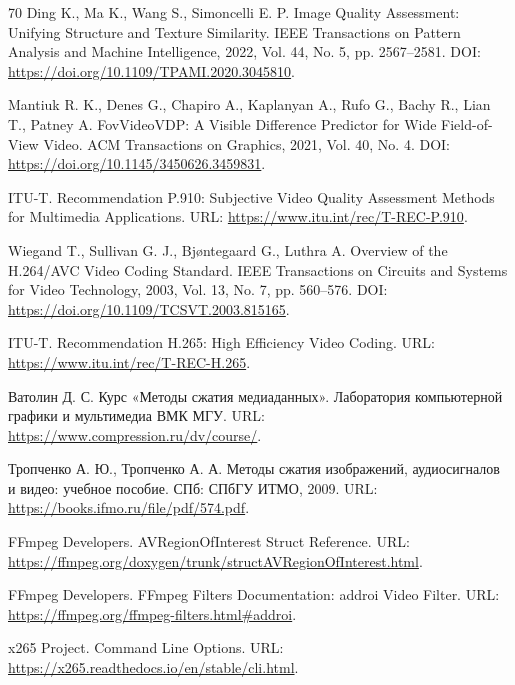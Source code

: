 \documentclass[12pt,a4paper,oneside,openany]{report}
\begin{document}
\begin{thebibliography}{70}
  Ding K., Ma K., Wang S., Simoncelli E. P. Image Quality Assessment: Unifying Structure and
  Texture Similarity. IEEE Transactions on Pattern Analysis and Machine Intelligence, 2022,
  Vol. 44, No. 5, pp. 2567--2581. DOI: \url{https://doi.org/10.1109/TPAMI.2020.3045810}.

  Mantiuk R. K., Denes G., Chapiro A., Kaplanyan A., Rufo G., Bachy R., Lian T., Patney A.
  FovVideoVDP: A Visible Difference Predictor for Wide Field-of-View Video. ACM Transactions on
  Graphics, 2021, Vol. 40, No. 4. DOI: \url{https://doi.org/10.1145/3450626.3459831}.

  ITU-T. Recommendation P.910: Subjective Video Quality Assessment Methods for Multimedia
  Applications. URL: \url{https://www.itu.int/rec/T-REC-P.910}.


  Wiegand T., Sullivan G. J., Bjøntegaard G., Luthra A. Overview of the H.264/AVC Video Coding
  Standard. IEEE Transactions on Circuits and Systems for Video Technology, 2003, Vol. 13, No. 7,
  pp. 560--576. DOI: \url{https://doi.org/10.1109/TCSVT.2003.815165}.

  ITU-T. Recommendation H.265: High Efficiency Video Coding. URL:
  \url{https://www.itu.int/rec/T-REC-H.265}.

  Ватолин Д. С. Курс «Методы сжатия медиаданных». Лаборатория компьютерной графики и мультимедиа
  ВМК МГУ. URL: \url{https://www.compression.ru/dv/course/}.

  Тропченко А. Ю., Тропченко А. А. Методы сжатия изображений, аудиосигналов и видео: учебное
  пособие. СПб: СПбГУ ИТМО, 2009. URL: \url{https://books.ifmo.ru/file/pdf/574.pdf}.

  FFmpeg Developers. AVRegionOfInterest Struct Reference. URL:
  \url{https://ffmpeg.org/doxygen/trunk/structAVRegionOfInterest.html}.

  FFmpeg Developers. FFmpeg Filters Documentation: addroi Video Filter. URL:
  \url{https://ffmpeg.org/ffmpeg-filters.html#addroi}.

  x265 Project. Command Line Options. URL: \url{https://x265.readthedocs.io/en/stable/cli.html}.


\end{thebibliography}
\end{document}
